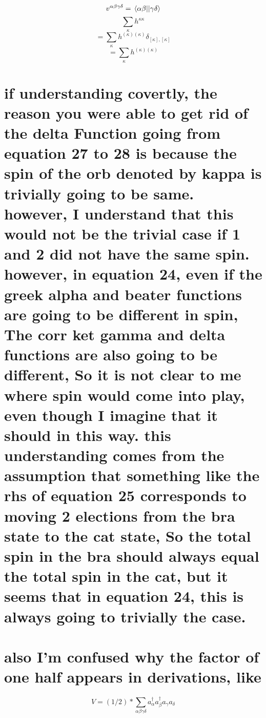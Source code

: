 \documentclass[12pt]{article}
\begin{document}
\begin{equation}
    v^{\alpha \beta \gamma  \delta }=\mel{\alpha \beta }{}{\gamma \delta }
\end{equation}
\begin{equation}
    \sum_{\kappa } h^{\kappa \kappa }
\end{equation}
\begin{equation}
    =\sum_{\kappa } h^{(\kappa )(\kappa )}\delta _{[\kappa ],[\kappa ]}
\end{equation}
\begin{equation}
    =\sum_{\kappa } h^{(\kappa )(\kappa )}
\end{equation}
\section{if understanding covertly, the reason you were able to get rid of the delta Function going from equation 27 to 28 is because the spin of the orb denoted by kappa is trivially going to be same. however, I understand that this would not be the trivial case if 1 and 2 did not have the same spin. however, in equation 24, even if the greek alpha and beater functions are going to be different in spin, The corr ket gamma and delta functions are also going to be different, So it is not clear to me where spin would come into play, even though I imagine that it should in this way. this understanding comes from the assumption that something like the rhs of equation 25 corresponds to moving 2 elections from the bra state to the cat state, So the total spin in the bra should always equal the total spin in the cat, but it seems that in equation 24, this is always going to trivially the case.}
\section{also I'm confused why the factor of one half appears in derivations, like}
\begin{equation}
    V=(1/2)*\sum_{\alpha \beta \gamma \delta}a^{\dag}_{\alpha }a^{\dag}_{\beta }a_{\gamma }a_{\delta } 
\end{equation}
\end{document}
